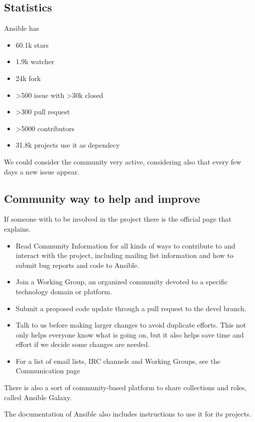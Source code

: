 \documentclass[12pt,a4paper,openright,twoside]{book}
\begin{document}
\subsection{Statistics}
Ansible has 
\begin{itemize}
    \item 60.1k stars
    \item 1.9k watcher
    \item 24k fork
    \item >500 issue with >30k closed
    \item >300 pull request
    \item >5000 contributors
    \item 31.8k projects use it as dependecy
\end{itemize}

We could consider the community very active, considering also that every few days a new issue appear.

\subsection{Community way to help and improve}
If someone with to be involved in the project there is the official page that explains\cite {ansibleGithub}.

\begin{itemize}
    \item Read Community Information for all kinds of ways to contribute to and interact with the project, including mailing list information and how to submit bug reports and code to Ansible.
    \item Join a Working Group, an organized community devoted to a specific technology domain or platform.
    \item Submit a proposed code update through a pull request to the devel branch.
    \item Talk to us before making larger changes to avoid duplicate efforts. This not only helps everyone know what is going on, but it also helps save time and effort if we decide some changes are needed.
    \item For a list of email lists, IRC channels and Working Groups, see the Communication page
\end{itemize}

There is also a sort of community-based platform to share collections and roles, called Ansible Galaxy\cite{ansibleGalaxy}.



The documentation of Ansible also includes instructions to use it for its projects.
\end{document}
